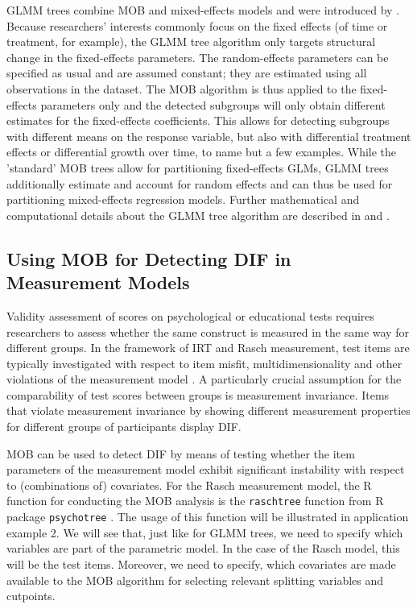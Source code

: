 \documentclass[doc,floatsintext,natbib]{apa7}
\begin{document}
GLMM trees combine MOB and mixed-effects models and were introduced by \cite{FokkySmit18}. Because researchers' interests commonly focus on the fixed effects (of time or treatment, for example), the GLMM tree algorithm only targets structural change in the fixed-effects parameters. The random-effects parameters can be specified as usual and are assumed constant; they are estimated using all observations in the dataset. The MOB algorithm is thus applied to the fixed-effects parameters only and the detected subgroups will only obtain different estimates for the fixed-effects coefficients. This allows for detecting subgroups with different means on the response variable, but also with differential treatment effects or differential growth over time, to name but a few examples. While the 'standard' MOB trees \cite{ZeilyHoth08} allow for partitioning fixed-effects GLMs, GLMM trees additionally estimate and account for random effects and can thus be used for partitioning mixed-effects regression models. Further mathematical and computational details about the GLMM tree algorithm are described in \cite{FokkySmit18} and \citep{FokkyZeil23}. 



\subsection{Using MOB for Detecting DIF in Measurement Models}

Validity assessment of scores on psychological or educational tests requires researchers to assess whether the same construct is measured in the same way for different groups. In the framework of IRT and Rasch measurement, test items are typically investigated with respect to item misfit, multidimensionality and other violations of the measurement model \citep[cf., e.g.,][for an introduction]{DebStrZei:2022:CRC}.  A particularly crucial assumption for the comparability of test scores between groups is measurement invariance. Items that violate measurement invariance by showing different measurement properties for different groups of participants display DIF.

MOB can be used to detect DIF by means of testing whether the item parameters of the measurement model exhibit significant instability with respect to (combinations of) covariates. For the Rasch measurement model, the R function for conducting the MOB analysis is the \texttt{raschtree} function from R package \texttt{psychotree} \citep{StroyKopf15}. The usage of this function will be illustrated in application example 2. We will see that, just like for  GLMM trees, we need to specify which variables are part of the parametric model. In the case of the Rasch model, this will be the test items. Moreover, we need to specify, which covariates are made available to the MOB algorithm for selecting relevant splitting variables and cutpoints. 
\end{document}
